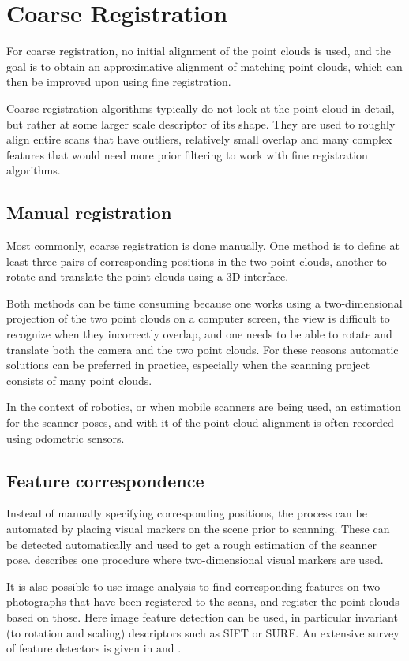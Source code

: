 \section{Coarse Registration}
For coarse registration, no initial alignment of the point clouds is used, and the goal is to obtain an approximative alignment of matching point clouds, which can then be improved upon using fine registration.

Coarse registration algorithms typically do not look at the point cloud in detail, but rather at some larger scale descriptor of its shape. They are used to roughly align entire scans that have outliers, relatively small overlap and many complex features that would need more prior filtering to work with fine registration algorithms.

\subsection{Manual registration}
Most commonly, coarse registration is done manually. One method is to define at least three pairs of corresponding positions in the two point clouds, another to rotate and translate the point clouds using a 3D interface.

Both methods can be time consuming because one works using a two-dimensional projection of the two point clouds on a computer screen, the view is difficult to recognize when they incorrectly overlap, and one needs to be able to rotate and translate both the camera and the two point clouds. For these reasons automatic solutions can be preferred in practice, especially when the scanning project consists of many point clouds.

In the context of robotics, or when mobile scanners are being used, an estimation for the scanner poses, and with it of the point cloud alignment is often recorded using odometric sensors.


\subsection{Feature correspondence}
Instead of manually specifying corresponding positions, the process can be automated by placing visual markers on the scene prior to scanning. These can be detected automatically and used to get a rough estimation of the scanner pose. \cite{Mati2011} describes one procedure where two-dimensional visual markers are used.

It is also possible to use image analysis to find corresponding features on two photographs that have been registered to the scans, and register the point clouds based on those. \cite{Tour2009} Here image feature detection can be used, in particular invariant (to rotation and scaling) descriptors such as SIFT or SURF. An extensive survey of feature detectors is given in \cite{Tuyt2007} and \cite{Saxe2014}.

